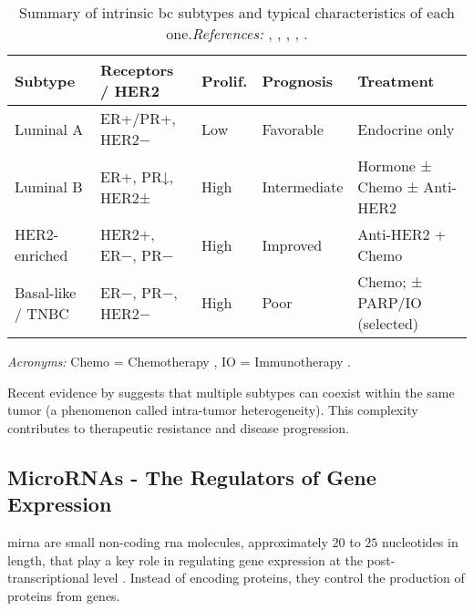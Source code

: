 \renewcommand{\arraystretch}{1.3}
\begin{table}
  \centering
  \small
  \caption{Summary of intrinsic \gls{bc} subtypes and typical characteristics of each one.\newline\textit{References:} \cite{clinical_implication_bca_Adamo2015}, \cite{diff_bca_usa_Howlader2018}, \cite{bc_subtypes_Prat2015Clinical}, \cite{updatedbca_Hong2022Breast}, \cite{tnbc_therapies_Mahalingam2020The}.}
  \label{tab:bc_subtypes_summary}
  \begin{tabularx}{\textwidth}{l l l l X}
    \toprule
    \textbf{Subtype}  & \textbf{Receptors / HER2} & \textbf{Prolif.} & \textbf{Prognosis} & \textbf{Treatment}          \\
    \midrule
    Luminal A         & ER+/PR+, HER2−            & Low              & Favorable          & Endocrine only              \\
    \midrule
    Luminal B         & ER+, PR↓, HER2±           & High             & Intermediate       & Hormone ± Chemo ± Anti-HER2 \\
    \midrule
    HER2-enriched     & HER2+, ER−, PR−           & High             & Improved           & Anti-HER2 + Chemo           \\
    \midrule
    Basal-like / TNBC & ER−, PR−, HER2−           & High             & Poor               & Chemo; ± PARP/IO (selected) \\

    \bottomrule
  \end{tabularx}

  \vspace{1ex}
  \raggedright
  \footnotesize
  \textit{Acronyms:} Chemo = Chemotherapy , IO = Immunotherapy .
\end{table}

Recent evidence by
\textcite{intratumor_heterogeneity_Yeo2017,origins_and_evolution_bca_Polyak2007}
suggests that multiple subtypes can coexist within the same tumor (a phenomenon
called intra-tumor heterogeneity). This complexity contributes to therapeutic
resistance and disease progression.

\subsection{MicroRNAs - The Regulators of Gene Expression}
\label{sec:microRNA}
\gls{mirna} are small non-coding \gls{rna} molecules, approximately $20$
to $25$ nucleotides in length, that play a key role in regulating gene
expression at the post-transcriptional level
\cite{regulatory_mecha_mirnaGulyaeva2016,
  first_mirna_Ambros1993,post_transcript_wightman1993}. Instead of encoding
proteins, they control the production of proteins from genes.

